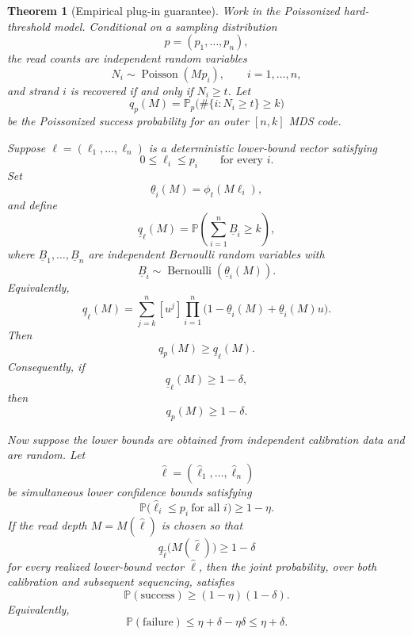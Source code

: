 \documentclass[11pt]{article}
\newtheorem{theorem}{Theorem}
\theoremstyle{definition}
\theoremstyle{remark}
\DeclareMathOperator{\Poisson}{Poisson}
\DeclareMathOperator{\Bernoulli}{Bernoulli}
\newcommand{\Pbb}{\mathbb P}
\newcommand{\1}{\mathbf 1}
\begin{document}
\begin{theorem}[Empirical plug-in guarantee]\label{thm:plugin}
Work in the Poissonized hard-threshold model.  Conditional on a sampling distribution
\[
  p=(p_1,\ldots,p_n),
\]
the read counts are independent random variables
\[
  N_i\sim\Poisson(Mp_i),\qquad i=1,\ldots,n,
\]
and strand \(i\) is recovered if and only if \(N_i\ge t\).  Let
\[
  q_p(M)=\Pbb_p\bigl(\#\{i:N_i\ge t\}\ge k\bigr)
\]
be the Poissonized success probability for an outer \([n,k]\) MDS code.

Suppose \(\ell=(\ell_1,\ldots,\ell_n)\) is a deterministic lower-bound vector satisfying
\[
  0\le \ell_i\le p_i\qquad\text{for every }i.
\]
Set
\[
  \underline\theta_i(M)=\phi_t(M\ell_i),
\]
and define
\[
  \underline q_\ell(M)
  =\Pbb\left(\sum_{i=1}^n \underline B_i\ge k\right),
\]
where \(\underline B_1,\ldots,\underline B_n\) are independent Bernoulli random variables with
\[
  \underline B_i\sim\Bernoulli(\underline\theta_i(M)).
\]
Equivalently,
\[
  \underline q_\ell(M)
  =\sum_{j=k}^{n}[u^j]
    \prod_{i=1}^n\bigl(1-\underline\theta_i(M)+\underline\theta_i(M)u\bigr).
\]
Then
\[
  q_p(M)\ge \underline q_\ell(M).
\]
Consequently, if
\[
  \underline q_\ell(M)\ge 1-\delta,
\]
then
\[
  q_p(M)\ge 1-\delta.
\]

Now suppose the lower bounds are obtained from independent calibration data and are random.  Let
\[
  \widehat\ell=(\widehat\ell_1,\ldots,\widehat\ell_n)
\]
be simultaneous lower confidence bounds satisfying
\[
  \Pbb\bigl(\widehat\ell_i\le p_i\ \text{for all }i\bigr)\ge 1-\eta.
\]
If the read depth \(M=M(\widehat\ell)\) is chosen so that
\[
  \underline q_{\widehat\ell}\bigl(M(\widehat\ell)\bigr)\ge 1-\delta
\]
for every realized lower-bound vector \(\widehat\ell\), then the joint probability, over both calibration and subsequent sequencing, satisfies
\[
  \Pbb(\mathrm{success})\ge (1-\eta)(1-\delta).
\]
Equivalently,
\[
  \Pbb(\mathrm{failure})\le \eta+\delta-\eta\delta\le \eta+\delta.
\]
\end{theorem}
\end{document}

